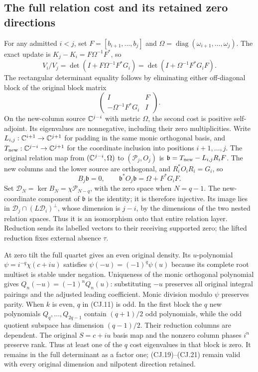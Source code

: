 \subsection{The full relation cost and its retained zero directions}

For any admitted $i<j$, set $F=[b_{i+1},\ldots,b_j]$ and
$\Omega=\operatorname{diag}(\omega_{i+1},\ldots,\omega_j)$.
The exact update is $K_j-K_i=F\Omega^{-1}F^*$, so
\[
 V_i/V_j=\det(I+F\Omega^{-1}F^*G_i)
         =\det(I+\Omega^{-1}F^*G_iF).
 \tag{CJ.20}
\]
The rectangular determinant equality follows by eliminating either
off-diagonal block of the original block matrix
\[
 \begin{pmatrix}I&F\\-\Omega^{-1}F^*G_i&I\end{pmatrix}.
\]
On the new-column source $\mathbb C^{j-i}$ with metric $\Omega$, the
second cost is positive self-adjoint. Its eigenvalues are
nonnegative, including their zero multiplicities.
Write $L_{i,j}:\mathbb C^{i+1}\to\mathbb C^{j+1}$ for padding in the
same monic orthogonal basis, and
$T_{\rm new}:\mathbb C^{j-i}\to\mathbb C^{j+1}$ for the coordinate inclusion
into positions $i+1,\ldots,j$. The original relation map from
$(\mathbb C^{j-i},\Omega)$ to $(\mathcal P_j,O_j)$ is
$\mathfrak b=T_{\rm new}-L_{i,j}R_iF$.
The new columns and the lower source are orthogonal, and
$R_i^*O_iR_i=G_i$, so
\[
 B_j\mathfrak b=0,\qquad
 \mathfrak b^*O_j\mathfrak b=\Omega+F^*G_iF.
 \tag{CJ.21}
\]
Set $\mathcal D_N=\ker B_N=\chi\mathcal P_{N-q}$, with the
zero space when $N=q-1$. The new-coordinate component of $\mathfrak b$ is the identity;
it is therefore injective. Its image lies in
$\mathcal D_j\cap(L\mathcal D_i)^\perp$, whose dimension is
$j-i$, by the dimensions of the two nested relation spaces.
Thus it is an isomorphism onto that entire relation layer.
Reduction sends its labelled vectors to their receiving supported
zero; the lifted reduction fixes external absence $\tau$.

At zero tilt the full quartet gives an even original density.
Its $u$-polynomial $\psi=i^{-q}\chi(c+iu)$ satisfies
$\psi(-u)=(-1)^q\psi(u)$ because its complete root multiset
is stable under negation. Uniqueness of the monic orthogonal
polynomial gives $Q_n(-u)=(-1)^nQ_n(u)$: substituting $-u$
preserves all original integral pairings and the adjusted leading
coefficient. Monic division modulo $\psi$ preserves parity.
When $k$ is even, $q$ in (CJ.11) is odd. In the first block
the $q$ new polynomials $Q_q,\ldots,Q_{2q-1}$ contain
$(q+1)/2$ odd polynomials, while the odd quotient subspace has
dimension $(q-1)/2$. Their reduction columns are dependent.
The original $S=c+iu$ basis map and the nonzero column phases
$i^n$ preserve rank. Thus at least one of the $q$ cost eigenvalues
in that block is zero. It remains in the full determinant as a
factor one; (CJ.19)--(CJ.21) remain valid with every original
dimension and nilpotent direction retained.


